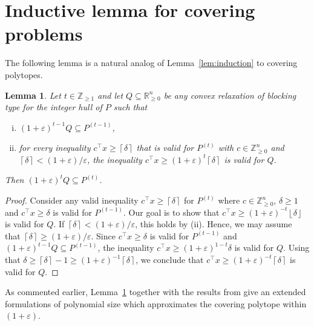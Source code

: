 \documentclass[11pt]{article}
\newcommand{\larstodo}[1]{\todo[backgroundcolor=pinktransparent, linecolor=pink!80]{#1}}
\newcommand{\R}{\mathbb{R}}
\newcommand{\Z}{\mathbb{Z}}
\newcommand{\floor}[1]{\left\lfloor #1 \right\rfloor}
\newcommand{\ceil}[1]{\left\lceil #1 \right\rceil}
\newcommand{\eps}{\varepsilon}
\newcommand{\numrounds}{t}
\newtheorem{lemma}[theorem]{Lemma}
\theoremstyle{remark}
\begin{document}
\section{Inductive lemma for covering problems}\label{appendix:covering}
The following lemma is a natural analog of Lemma~\ref{lem:induction} to covering polytopes.
\begin{lemma} \label{lem:induction-covering}
    Let $\numrounds \in \Z_{\ge 1}$ and let $Q \subseteq \R^n_{\ge 0}$ be any convex relaxation of blocking type for the integer hull of $P$ such that 
    \begin{enumerate}[(i)]
    \item $(1+\eps)^{\numrounds-1}Q \subseteq P^{(\numrounds-1)}$,
    \item for every inequality $c^\intercal x \ge \ceil{\delta}$ that is valid for $P^{(\numrounds)}$ with $c \in \Z^n_{\ge 0}$ and $\ceil{\delta} < (1+\eps)/\eps$, the inequality $c^\intercal x \ge (1+\eps)^\numrounds \ceil{\delta}$ is valid for $Q$. 
    \end{enumerate}
    Then $(1+\eps)^{\numrounds}Q \subseteq P^{(\numrounds)}$.
\end{lemma}
\begin{proof}
    Consider any valid inequality $c^\intercal x \ge \ceil{\delta}$ for $P^{(\numrounds)}$ where $c \in \Z^n_{\ge 0}$, $\delta \ge 1$ and $c^\intercal x \ge \delta$ is valid for $P^{(\numrounds-1)}$. Our goal is to show that $c^\intercal x \ge (1+\eps)^{-\numrounds} \floor{\delta}$ is valid for $Q$. 
        If $\ceil{\delta} < (1+\eps)/\eps$, this holds by (ii). Hence, we may assume that $\ceil{\delta} \ge (1+\eps)/\eps$. Since $c^\intercal x \ge \delta$ is valid for $P^{(\numrounds-1)}$ and $(1+\eps)^{\numrounds-1} Q \subseteq P^{(\numrounds-1)}$, the inequality $c^\intercal x \ge (1+\eps)^{1-\numrounds} \delta$ is valid for $Q$. 
    Using that $\delta \ge \ceil{\delta} - 1 \ge (1+\eps)^{-1} \ceil{\delta}$, we conclude that $c^\intercal x \ge (1+\eps)^{-\numrounds} \ceil{\delta}$ is valid for $Q$.
\end{proof}
As commented earlier, Lemma~\ref{lem:induction-covering} together with the results from \cite{fhw21} give an extended formulations of polynomial size which approximates the covering polytope within $(1+\eps)$.
\end{document}
